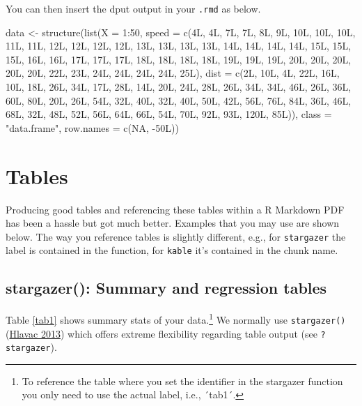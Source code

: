 \documentclass[
  12pt,
]{article}
\newenvironment{Shaded}{\begin{snugshade}}{\end{snugshade}}
\newcommand{\AttributeTok}[1]{\textcolor[rgb]{0.77,0.63,0.00}{#1}}
\newcommand{\ConstantTok}[1]{\textcolor[rgb]{0.00,0.00,0.00}{#1}}
\newcommand{\DecValTok}[1]{\textcolor[rgb]{0.00,0.00,0.81}{#1}}
\newcommand{\FunctionTok}[1]{\textcolor[rgb]{0.00,0.00,0.00}{#1}}
\newcommand{\NormalTok}[1]{#1}
\newcommand{\OtherTok}[1]{\textcolor[rgb]{0.56,0.35,0.01}{#1}}
\newcommand{\SpecialCharTok}[1]{\textcolor[rgb]{0.00,0.00,0.00}{#1}}
\newcommand{\StringTok}[1]{\textcolor[rgb]{0.31,0.60,0.02}{#1}}
\begin{document}
You can then insert the dput output in your \texttt{.rmd} as below.

\begin{Shaded}
\begin{Highlighting}[]
\NormalTok{data }\OtherTok{\textless{}{-}} \FunctionTok{structure}\NormalTok{(}\FunctionTok{list}\NormalTok{(}\AttributeTok{X =} \DecValTok{1}\SpecialCharTok{:}\DecValTok{50}\NormalTok{, }\AttributeTok{speed =} \FunctionTok{c}\NormalTok{(4L, 4L, 7L, 7L, 8L, 9L, 10L, }
\NormalTok{10L, 10L, 11L, 11L, 12L, 12L, 12L, 12L, 13L, 13L, 13L, 13L, 14L, }
\NormalTok{14L, 14L, 14L, 15L, 15L, 15L, 16L, 16L, 17L, 17L, 17L, 18L, 18L, }
\NormalTok{18L, 18L, 19L, 19L, 19L, 20L, 20L, 20L, 20L, 20L, 22L, 23L, 24L, }
\NormalTok{24L, 24L, 24L, 25L), }\AttributeTok{dist =} \FunctionTok{c}\NormalTok{(2L, 10L, 4L, 22L, 16L, 10L, 18L, }
\NormalTok{26L, 34L, 17L, 28L, 14L, 20L, 24L, 28L, 26L, 34L, 34L, 46L, 26L, }
\NormalTok{36L, 60L, 80L, 20L, 26L, 54L, 32L, 40L, 32L, 40L, 50L, 42L, 56L, }
\NormalTok{76L, 84L, 36L, 46L, 68L, 32L, 48L, 52L, 56L, 64L, 66L, 54L, 70L, }
\NormalTok{92L, 93L, 120L, 85L)), }
\AttributeTok{class =} \StringTok{"data.frame"}\NormalTok{, }\AttributeTok{row.names =} \FunctionTok{c}\NormalTok{(}\ConstantTok{NA}\NormalTok{, }
\SpecialCharTok{{-}}\NormalTok{50L))}
\end{Highlighting}
\end{Shaded}

\hypertarget{sec:tables}{%
\section{Tables}\label{sec:tables}}

Producing good tables and referencing these tables within a R Markdown PDF has been a hassle but got much better. Examples that you may use are shown below. The way you reference tables is slightly different, e.g., for \texttt{stargazer} the label is contained in the function, for \texttt{kable} it's contained in the chunk name.

\hypertarget{stargazer-summary-and-regression-tables}{%
\subsection{stargazer(): Summary and regression tables}\label{stargazer-summary-and-regression-tables}}

Table \ref{tab1} shows summary stats of your data.\footnote{To reference the table where you set the identifier in the stargazer function you only need to use the actual label, i.e., ´tab1´.} We normally use \texttt{stargazer()} (\protect\hyperlink{ref-hlavac2013stargazer}{Hlavac 2013}) which offers extreme flexibility regarding table output (see \texttt{?stargazer}).
\end{document}
